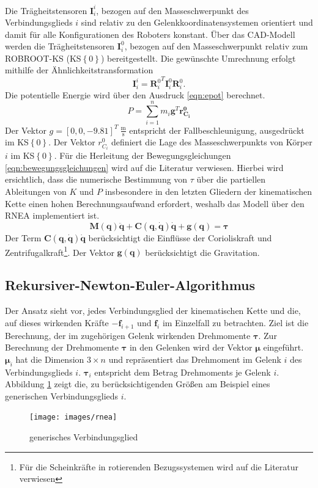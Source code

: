 Die Trägheitstensoren $\bm{I}^{i}_{i}$, bezogen auf den Masseschwerpunkt des Verbindungsglieds $i$ sind relativ zu den Gelenkkoordinatensystemen orientiert und damit für alle Konfigurationen des Roboters konstant. 
Über das CAD-Modell werden die Trägheitstensoren $\bm{I}^{0}_{i}$, bezogen auf den Masseschwerpunkt relativ zum ROBROOT-KS (KS$\left\{0\right\}$) bereitgestellt. Die gewünschte Umrechnung erfolgt mithilfe der Ähnlichkeitstransformation 
%
\begin{equation}
	\label{eqn:similarity}
	\bm{I}^{i}_{i} = {\bm{R}^{0}_i}^T \bm{I}^{0}_{i} \bm{R}^0_i.
\end{equation}
%
Die potentielle Energie wird über den Ausdruck \ref{eqn:epot} berechnet.
%
\begin{equation}
	\label{eqn:epot}
	P = \sum_{i=1}^{n} m_i \bm{g}^T\bm{r^0_{C_i}}
\end{equation}
%
Der Vektor $g = [0,0,-9.81]^T~\frac{\text{m}}{\text{s}}$ entspricht der Fallbeschleunigung, ausgedrückt im KS$\left\{0\right\}$. Der Vektor $r^0_{C_i}$ definiert die Lage des Masseschwerpunkts von Körper $i$ im  KS$\left\{0\right\}$. Für die Herleitung der Bewegungsgleichungen \ref{eqn:bewegungsgleichungen} wird auf die Literatur \autocite[S.~180 ff.]{Spong.2020} verwiesen. Hierbei wird ersichtlich, dass die numerische Bestimmung von $\tau$ über die partiellen Ableitungen von $K$ und $P$ insbesondere in den letzten Gliedern der kinematischen Kette einen hohen Berechnungsaufwand erfordert, weshalb das Modell über den RNEA implementiert ist. 
%
\begin{equation}
	\label{eqn:bewegungsgleichungen}
	\bm{M}(\bm{q})\ddot{\bm{q}} + \bm{C}(\bm{q},\dot{\bm{q}})\dot{\bm{q}} + \bm{g}(\bm{q}) = \bm{\tau}
\end{equation}
%
Der Term $\bm{C}(\bm{q},\dot{\bm{q}})\dot{\bm{q}}$ berücksichtigt die Einflüsse der Corioliskraft und Zentrifugalkraft\footnote{Für die Scheinkräfte in rotierenden Bezugssystemen wird auf die Literatur ~\autocite[S.~159]{Roth.2016} verwiesen}. Der Vektor $\bm{g}(\bm{q})$ berücksichtigt die Gravitation.
%
\subsection{Rekursiver-Newton-Euler-Algorithmus}
%
Der Ansatz sieht vor, jedes Verbindungsglied der kinematischen Kette und die, auf dieses wirkenden Kräfte $ -\boldsymbol{f}_{i+1} $ und $ \boldsymbol{f}_i $ im Einzelfall zu betrachten. Ziel ist die Berechnung, der im zugehörigen Gelenk wirkenden Drehmomente $\bm{\tau}$. Zur Berechnung der Drehmomente $\bm{\tau}$ in den Gelenken wird der Vektor $\bm{\mu}$ eingeführt. $\bm{\mu}_i$ hat die Dimension $3 \times n$ und repräsentiert das Drehmoment im Gelenk $i$ des Verbindungsglieds $i$. $\bm{\tau}_i$ entspricht dem Betrag Drehmoments je Gelenk $i$. Abbildung \ref{fig:rnea} zeigt die, zu berücksichtigenden Größen am Beispiel eines generischen Verbindungsglieds $i$.
%
\begin{figure}[tbph]
	\centering
	\texttt{[image: images/rnea]}
	\caption{generisches Verbindungsglied \cite[S.~283]{Siciliano.2011}}
	\label{fig:rnea}
\end{figure} 
%
